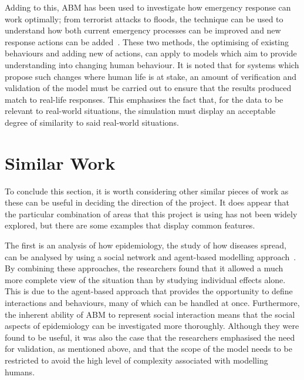 \documentclass[]{report}
\begin{document}
Adding to this, ABM has been used to investigate how emergency response can work optimally; from terrorist attacks to floods, the technique can be used to understand how both current emergency processes can be improved and new response actions can be added~\cite{emergency}. These two methods, the optimising of existing behaviours and adding new of actions, can apply to models which aim to provide understanding into changing human behaviour. It is noted that for systems which propose such changes where human life is at stake, an amount of verification and validation of the model must be carried out to ensure that the results produced match to real-life responses. This emphasises the fact that, for the data to be relevant to real-world situations, the simulation must display an acceptable degree of similarity to said real-world situations.

\section{Similar Work}

To conclude this section, it is worth considering other similar pieces of work as these can be useful in deciding the direction of the project. It does appear that the particular combination of areas that this project is using has not been widely explored, but there are some examples that display common features.

The first is an analysis of how epidemiology, the study of how diseases spread, can be analysed by using a social network and agent-based modelling approach~\cite{epid}. By combining these approaches, the researchers found that it allowed a much more complete view of the situation than by studying individual effects alone. This is due to the agent-based approach that provides the opportunity to define interactions and behaviours, many of which can be handled at once. Furthermore, the inherent ability of ABM to represent social interaction means that the social aspects of epidemiology can be investigated more thoroughly. Although they were found to be useful, it was also the case that the researchers emphasised the need for validation, as mentioned above, and that the scope of the model needs to be restricted to avoid the high level of complexity associated with modelling humans.
\end{document}
